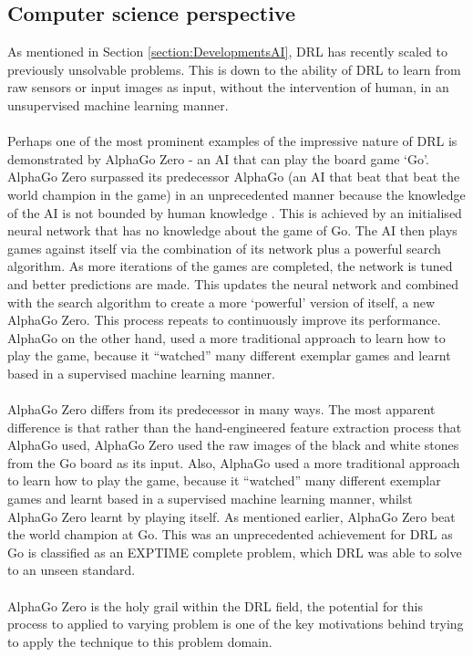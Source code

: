 \documentclass[ %
                    author={Ashwinder Khurana},
                supervisor={Prof Dave Cliff},
                    degree={MEng},
                     title={The Deeply Reinforced Trader},
                  subtitle={},
                      type={enterprise},
                      year={2020} ]{dissertation}
\begin{document}
\vspace{0.5cm}
\subsection{Computer science perspective}
\label{subsection:Computer Science perspective}
\vspace{0.5cm} 
As mentioned in Section \ref{section:DevelopmentsAI}, DRL has recently scaled to previously unsolvable problems. This is down to the ability of DRL to learn from raw sensors or input images as input, without the intervention of human, in an unsupervised machine learning manner. 
\\
\\
Perhaps one of the most prominent examples of the impressive nature of DRL is demonstrated by AlphaGo Zero - an AI that can play the board game \enquote*{Go}. AlphaGo Zero surpassed its predecessor AlphaGo (an AI that beat that beat the world champion in the game) in an unprecedented manner because the knowledge of the AI is not bounded by human knowledge \cite{deepmind-alpha-go-zero}. This is achieved by an initialised neural network that has no knowledge about the game of Go. The AI then plays games against itself via the combination of its network plus a powerful search algorithm. As more iterations of the games are completed, the network is tuned and better predictions are made. This updates the neural network and combined with the search algorithm to create a more \enquote*{powerful} version of itself, a new AlphaGo Zero. This process repeats to continuously improve its performance. AlphaGo on the other hand, used a more traditional approach to learn how to play the game, because it \enquote{watched} many different exemplar games and learnt based in a supervised machine learning manner.
\\
\\
AlphaGo Zero differs from its predecessor in many ways. The most apparent difference is that rather than the hand-engineered feature extraction process that AlphaGo used, AlphaGo Zero used the raw images of the black and white stones from the Go board as its input. Also, AlphaGo used a more traditional approach to learn how to play the game, because it \enquote{watched} many different exemplar games and learnt based in a supervised machine learning manner, whilst AlphaGo Zero learnt by playing itself. As mentioned earlier, AlphaGo Zero beat the world champion at Go. This was an unprecedented achievement for DRL as Go is classified as an EXPTIME complete problem, which DRL was able to solve to an unseen standard.
\\
\\
AlphaGo Zero is the holy grail within the DRL field, the potential for this process to applied to varying problem is one of the key motivations behind trying to apply the technique to this problem domain.
\end{document}
